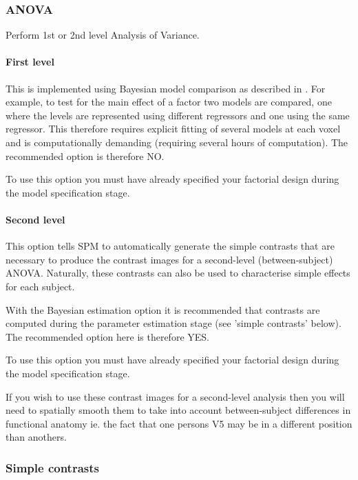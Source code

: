 \subsubsection{ANOVA}

Perform 1st or 2nd level Analysis of Variance.

\paragraph{First level}

This is implemented using Bayesian model comparison as described in \cite{will_bayes_srglm}. For example, to test for the main effect of a factor two models are compared, one where the levels are represented using different regressors and one using the same regressor. This therefore requires explicit fitting of several models at each voxel and is computationally demanding (requiring several hours of computation). The recommended option is therefore NO.

To use this option you must have already specified your factorial design during the model specification stage. 

\paragraph{Second level}

This option tells SPM to automatically generate the simple contrasts that are necessary to produce the contrast images for a second-level (between-subject) ANOVA. Naturally, these contrasts can also be used to characterise simple effects for each subject. 

With the Bayesian estimation option it is recommended that contrasts are computed during the parameter estimation stage (see 'simple contrasts' below). The recommended option here is therefore YES.

To use this option you must have already specified your factorial design during the model specification stage. 

If you wish to use these contrast images for a second-level analysis then you will need to spatially smooth them to take into account between-subject differences in functional anatomy ie. the fact that one persons V5 may be in a different position than anothers. 

\subsubsection{Simple contrasts}

